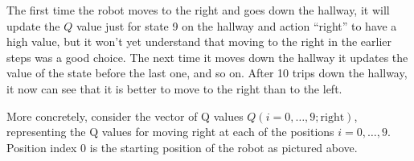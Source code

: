The first time the robot moves to the right and goes down the hallway,
it will update the $Q$ value just for state 9 on the hallway and
action ``right'' to have a high value, but it won't yet understand
that moving to the right in the earlier steps was a good choice. The
next time it moves down the hallway it updates the value of the state
before the last one, and so on.  After 10 trips down the hallway, it
now can see that it is better to move to the right than to the left.

\setcounter{MaxMatrixCols}{20}

More concretely, consider the vector of Q values $Q(i = 0, \ldots, 9;
  \text{right})$, representing the Q values for moving right at each of
the positions $i = 0, \ldots, 9$. Position index $0$ is the starting
position of the robot as pictured above.

